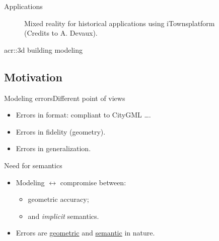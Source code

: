 \documentclass[12pt]{beamer}
\begin{document}
\begin{frame}{Applications}
{\begin{figure}[H]
                        \caption{Mixed reality for historical applications using iTowns\footnotemark platform (Credits to A. Devaux\footnotemark).}
                    \end{figure}
                    \addtocounter{footnote}{1}
                }
            \end{frame}

            \begin{frame}{\texorpdfstring{\acrshort*{acr::3d}}{3D} building modeling}
                \centering
                
            \end{frame}

        \subsection{Motivation}
            \begin{frame}{Modeling errors}{Different point of views}
                \begin{itemize}[label=\(\blacktriangleright\), font=\color{IGNGreen}]
                    \item<1-> Errors in format: compliant to CityGML \dots.
                    \item<2-> Errors in fidelity (geometry).
                    \item<3-> Errors in generalization.
                \end{itemize}
            \end{frame}

            \begin{frame}{Need for semantics}
                \begin{itemize}[label=\(\blacktriangleright\), font=\color{IGNGreen}]
                    \item<1-> Modeling \(\longleftrightarrow\) compromise between:
                    \begin{itemize}[label=\(\blacktriangleright\), font=\color{IGNGreen}]
                        \item<2-> geometric accuracy;
                        \item<3-> and \textit{implicit} semantics.
                    \end{itemize}
                    \item<4-> Errors are \underline{geometric} and \underline{semantic} in nature.
                \end{itemize}
            \end{frame}
        
\end{document}
